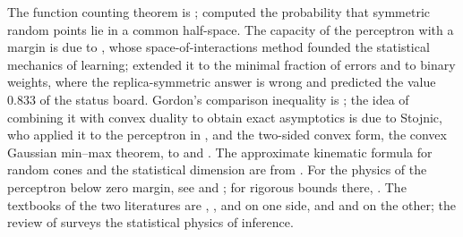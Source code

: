 \begin{refsection}
The function counting theorem is \textcite{Cover1965}; \textcite{Wendel1962} computed the probability that symmetric random points lie in a common half-space. The capacity of the perceptron with a margin is due to \textcite{Gardner1988}, whose space-of-interactions method founded the statistical mechanics of learning; \textcite{GardnerDerrida1988} extended it to the minimal fraction of errors and to binary weights, where the replica-symmetric answer is wrong and \textcite{KrauthMezard1989} predicted the value $0.833$ of the status board. Gordon's comparison inequality is \textcite{Gordon1985}; the idea of combining it with convex duality to obtain exact asymptotics is due to Stojnic, who applied it to the perceptron in \textcite{Stojnic2013a}, and the two-sided convex form, the convex Gaussian min--max theorem, to \textcite{ThrampoulidisOymakHassibi2015} and \textcite{ThrampoulidisAbbasiHassibi2018}. The approximate kinematic formula for random cones and the statistical dimension are from \textcite{AmelunxenEtAl2014}. For the physics of the perceptron below zero margin, see \textcite{FranzParisi2016} and \textcite{FranzEtAl2017}; for rigorous bounds there, \textcite{MontanariZhongZhou2024}. The textbooks of the two literatures are \textcite{MezardParisiVirasoro1987}, \textcite{Nishimori2001}, \textcite{EngelVandenBroeck2001} and \textcite{MezardMontanari2009} on one side, and \textcite{Talagrand2011a,Talagrand2011b} and \textcite{Panchenko2013b} on the other; the review of \textcite{ZdeborovaKrzakala2016} surveys the statistical physics of inference.

\printchapterbib
\end{refsection}
\rstfloatrestore

